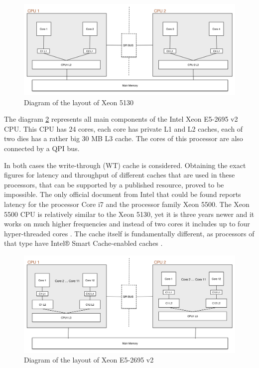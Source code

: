 \begin{figure}[ht!]
\centering
\includegraphics[width=145mm]{4/Xeon_5130.png}
\caption{Diagram of the layout of Xeon 5130}
\label{layout_xeon_5130}
\end{figure}

The diagram \ref{layout_xeon_2695} represents all main components of the Intel Xeon E5-2695 v2 CPU. This CPU has 24 cores, each core has private L1 and L2 caches, each of two dies has a rather big 30 MB L3 cache. The cores of this processor are also connected by a QPI bus.

In both cases the write-through (WT) cache is considered. Obtaining the exact figures for latency and throughput of different caches that are used in these processors, that can be supported by a published resource, proved to be impossible. The only official document from Intel \cite{Levinthal} that could be found reports latency for the processor Core i7 and the processor family Xeon 5500. The Xeon 5500 CPU is relatively similar to the Xeon 5130, yet it is three years newer and it works on much higher frequencies and instead of two cores it includes up to four hyper-threaded cores \cite{Intel2009}. The cache itself is fundamentally different, as processors of that type have Intel® Smart Cache-enabled caches \cite{Intel2012}.

\begin{figure}[ht!]
\centering
\includegraphics[width=145mm]{4/Xeon_E5-2695_v2.png}
\caption{Diagram of the layout of Xeon E5-2695 v2}
\label{layout_xeon_2695}
\end{figure}

